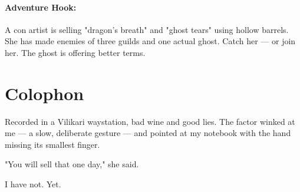 \paragraph{Adventure Hook:}
A con artist is selling "dragon's breath" and "ghost tears" using hollow barrels. She has made enemies of three guilds and one actual ghost. Catch her — or join her. The ghost is offering better terms.

\section*{Colophon}
Recorded in a Vilikari waystation, bad wine and good lies. The factor winked at me — a slow, deliberate gesture — and pointed at my notebook with the hand missing its smallest finger.

"You will sell that one day," she said.

I have not. Yet.